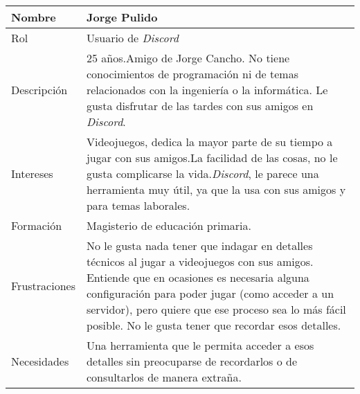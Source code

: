 \label{sec:personaUsuarioDiscord}
\begin{table}[H]
    \centering
    \begin{adjustbox}{max width=\textwidth}
    \begin{tabularx}{\textwidth}{|l|L|}
    \hline
        Nombre & Jorge Pulido \\ \hline
        Rol & Usuario de \textit{Discord} \\ \hline
        Descripción & 25 años.\linebreak Amigo de Jorge Cancho. No tiene conocimientos de programación ni de temas relacionados con la ingeniería o la informática. Le gusta disfrutar de las tardes con sus amigos en \textit{Discord}. \\ \hline
        Intereses & Videojuegos, dedica la mayor parte de su tiempo a jugar con sus amigos.\linebreak La facilidad de las cosas, no le gusta complicarse la vida.\linebreak \textit{Discord}, le parece una herramienta muy útil, ya que la usa con sus amigos y para temas laborales. \\ \hline
        Formación & Magisterio de educación primaria. \\ \hline
        Frustraciones & No le gusta nada tener que indagar en detalles técnicos al jugar a videojuegos con sus amigos. Entiende que en ocasiones es necesaria alguna configuración para poder jugar (como acceder a un servidor), pero quiere que ese proceso sea lo más fácil posible. No le gusta tener que recordar esos detalles. \\ \hline
        Necesidades & Una herramienta que le permita acceder a esos detalles sin preocuparse de recordarlos o de consultarlos de manera extraña. \\ \hline
    \end{tabularx}
    \end{adjustbox}
\end{table}

